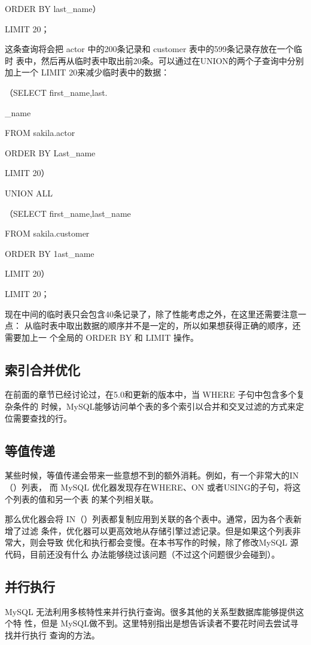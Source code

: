 ORDER BY last\_name）

LIMIT 20；

这条查询将会把 actor 中的200条记录和 customer 表中的599条记录存放在一个临时
表中，然后再从临时表中取出前20条。可以通过在UNION的两个子查询中分别加上一个
LIMIT 20来减少临时表中的数据：

（SELECT first\_name,last.

\_name

FROM sakila.actor

ORDER BY Last\_name

LIMIT 20）

UNION ALL

（SELECT first\_name,last\_name

FROM sakila.customer

ORDER BY 1ast\_name

LIMIT 20）

LIMIT 20；

现在中间的临时表只会包含40条记录了，除了性能考虑之外，在这里还需要注意一点：
从临时表中取出数据的顺序并不是一定的，所以如果想获得正确的顺序，还需要加上一
个全局的 ORDER BY 和 LIMIT 操作。

\subsection{索引合并优化}
在前面的章节已经讨论过，在5.0和更新的版本中，当 WHERE 子句中包含多个复杂条件的
时候，MySQL能够访问单个表的多个索引以合并和交叉过滤的方式来定位需要查找的行。
\subsection{等值传递}
某些时候，等值传递会带来一些意想不到的额外消耗。例如，有一个非常大的IN（）列表，
而 MySQL 优化器发现存在WHERE、ON 或者USING的子句，将这个列表的值和另一个表
的某个列相关联。

那么优化器会将 IN（）列表都复制应用到关联的各个表中。通常，因为各个表新增了过滤
条件，优化器可以更高效地从存储引擎过滤记录。但是如果这个列表非常大，则会导致
优化和执行都会变慢。在本书写作的时候，除了修改MySQL 源代码，目前还没有什么
办法能够绕过该问题（不过这个问题很少会碰到）。

\subsection{并行执行}
MySQL 无法利用多核特性来并行执行查询。很多其他的关系型数据库能够提供这个特
性，但是 MySQL做不到。这里特别指出是想告诉读者不要花时间去尝试寻找并行执行
查询的方法。

